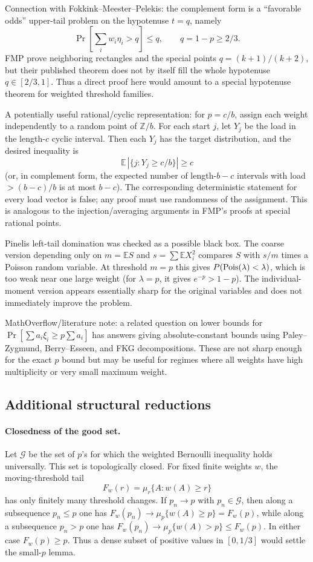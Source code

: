 \documentclass[12pt]{article}
\begin{document}
Connection with Fokkink--Meester--Pelekis: the complement form is a
``favorable odds'' upper-tail problem on the hypotenuse \(t=q\), namely
\[
  \Pr\!\left[\sum_i w_i\eta_i>q\right]\le q,\qquad q=1-p\ge2/3.
\]
FMP prove neighboring rectangles and the special points \(q=(k+1)/(k+2)\), but
their published theorem does not by itself fill the whole hypotenuse
\(q\in[2/3,1]\).  Thus a direct proof here would amount to a special
hypotenuse theorem for weighted threshold families.

A potentially useful rational/cyclic representation: for \(p=c/b\), assign each
weight independently to a random point of \(\mathbb Z/b\).  For each start \(j\),
let \(Y_j\) be the load in the length-\(c\) cyclic interval.  Then each \(Y_j\)
has the target distribution, and the desired inequality is
\[
  \mathbb E\,|\{j:Y_j\ge c/b\}|\ge c
\]
(or, in complement form, the expected number of length-\(b-c\) intervals with
load \(> (b-c)/b\) is at most \(b-c\)).  The corresponding deterministic
statement for every load vector is false; any proof must use randomness of the
assignment.  This is analogous to the injection/averaging arguments in FMP's
proofs at special rational points.

Pinelis left-tail domination was checked as a possible black box.  The coarse
version depending only on \(m=\mathbb E S\) and \(s=\sum\mathbb E X_i^2\)
compares \(S\) with \(s/m\) times a Poisson random variable.  At threshold
\(m=p\) this gives \(P({\rm Pois}(\lambda)<\lambda)\), which is too weak near
one large weight (for \(\lambda=p\), it gives \(e^{-p}>1-p\)).  The
individual-moment version appears essentially sharp for the original variables
and does not immediately improve the problem.

MathOverflow/literature note: a related question on lower bounds for
\(\Pr[\sum a_i\xi_i\ge p\sum a_i]\) has answers giving absolute-constant
bounds using Paley--Zygmund, Berry--Esseen, and FKG decompositions.  These are
not sharp enough for the exact \(p\) bound but may be useful for regimes where
all weights have high multiplicity or very small maximum weight.



\subsection*{Additional structural reductions}

\paragraph{Closedness of the good set.}
Let \(\mathcal G\) be the set of \(p\)'s for which the weighted Bernoulli
inequality holds universally.  This set is topologically closed.  For fixed
finite weights \(w\), the moving-threshold tail
\[
  F_w(r)=\mu_r\{A:w(A)\ge r\}
\]
has only finitely many threshold changes.  If \(p_n\to p\) with \(p_n\in
\mathcal G\), then along a subsequence \(p_n\le p\) one has
\(F_w(p_n)\to \mu_p\{w(A)\ge p\}=F_w(p)\), while along a subsequence
\(p_n>p\) one has \(F_w(p_n)\to\mu_p\{w(A)>p\}\le F_w(p)\).  In either case
\(F_w(p)\ge p\).  Thus a dense subset of positive values in \([0,1/3]\) would
settle the small-\(p\) lemma.
\end{document}

